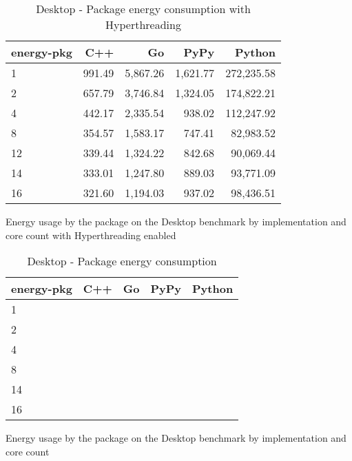 \begin{table}[H]
 \centering
    \begin{tabular}{lrrrr}
    \hline
    energy-pkg & C++ & Go & PyPy & Python \\
    \hline
    1 & 991.49 & 5,867.26 & 1,621.77 & 272,235.58 \\
    2 & 657.79 & 3,746.84 & 1,324.05 & 174,822.21 \\
    4 & 442.17 & 2,335.54 & 938.02 & 112,247.92 \\
    8 & 354.57 & 1,583.17 & 747.41 & 82,983.52 \\
    12 & 339.44 & 1,324.22 & 842.68 & 90,069.44 \\
    14 & 333.01 & 1,247.80 & 889.03 & 93,771.09 \\
    16 & 321.60 & 1,194.03 & 937.02 & 98,436.51 \\
    \hline
    \end{tabular}
\caption{Desktop - Package energy consumption with Hyperthreading}{Energy usage by the package on the Desktop benchmark by implementation and core count with Hyperthreading enabled}
\label{tab:desktop-energy-pkg-hyperthreading}
\end{table}

\begin{table}[H]
    \centering
    \begin{tabular}{lrrrr}
        \hline
        energy-pkg     & C++                 & Go          & PyPy       & Python              \\
        \hline
        1              &                     &             &            &                    \\
        2              &                     &             &            &                    \\
        4              &                     &             &            &                    \\
        8	           &                     &             &            &                    \\
        14             &                     &             &            &                    \\
        16             &                     &             &            &                    \\
        \hline
    \end{tabular}
\caption{Desktop - Package energy consumption}{Energy usage by the package on the Desktop benchmark by implementation and core count}
\label{tab:desktop-energy-pkg}
\end{table}

